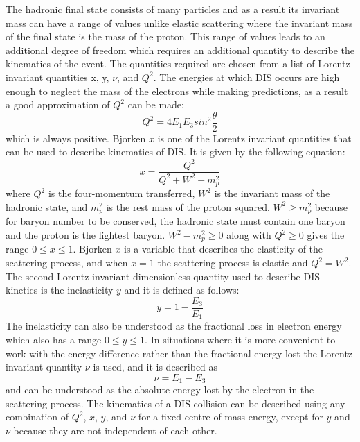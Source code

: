 \documentclass[journal, a4paper,12pt]{IEEEtran}
\begin{document}
The hadronic final state consists of many particles and as a result its invariant mass can have a range of values unlike elastic scattering where the invariant mass of the final state is the mass of the proton. This range of values leads to an additional degree of freedom which requires an additional quantity to describe the kinematics of the event. The quantities required are chosen from a list of Lorentz invariant quantities x, y, $\nu$, and $Q^2$. 
The energies at which DIS occurs are high enough to neglect the mass of the electrons while making predictions, as a result a good approximation of $Q^2$ can be made:
\begin{equation}
	Q^2 = 4E_1E_3sin^2\frac{\theta}{2}
\end{equation}
which is always positive.
Bjorken $x$ is one of the Lorentz invariant quantities that can be used to describe kinematics of DIS. It is given by the following equation: 
\begin{equation}
	x = \frac{Q^2}{Q^2 + W^2 - m_p^2}
\end{equation}
where $Q^2$ is the four-momentum transferred, $W^2$ is the invariant mass of the hadronic state, and $m_p^2$ is the rest mass of the proton squared. $W^2 \geq m_p^2$ because for baryon number to be conserved, the hadronic state must contain one baryon and the proton is the lightest baryon. $W^2 - m_p^2 \geq 0$ along with $Q^2 \geq 0$ gives the range $0 \leq x \leq 1$. Bjorken $x$ is a variable that describes the elasticity of the scattering process, and when $x = 1$ the scattering process is elastic and $Q^2 = W^2$.
The second Lorentz invariant dimensionless quantity used to describe DIS kinetics is the inelasticity $y$ and it is defined as follows:
\begin{equation}
	y = 1-\frac{E_3}{E_1}
\end{equation}
The inelasticity can also be understood as the fractional loss in electron energy which also has a range $0 \leq y \leq 1$.
In situations where it is more convenient to work with the energy difference rather than the fractional energy lost the Lorentz invariant quantity $\nu$ is used, and it is described as
\begin{equation}
	\nu = E_1 - E_3
\end{equation}
and can be understood as the absolute energy lost by the electron in the scattering process.
The kinematics of a DIS collision can be described using any combination of $Q^2$, $x$, $y$, and $\nu$ for a fixed centre of mass energy, except for $y$ and $\nu$ because they are not independent of each-other.
\end{document}
